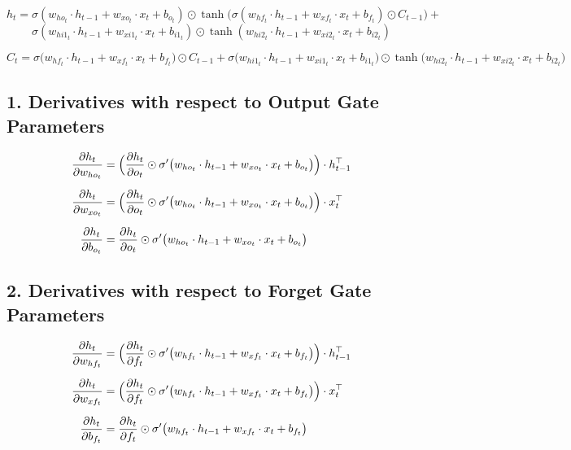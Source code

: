 \documentclass[12pt]{article}
\begin{document}
\[
h_t = \sigma(w_{ho_t} \cdot h_{t-1} + w_{xo_t} \cdot x_t + b_{o_t}) \odot \tanh\bigl( \sigma(w_{hf_t} \cdot h_{t-1} + w_{xf_t} \cdot x_t + b_{f_t}) \odot C_{t-1} \bigr) +
\]
\[
\sigma(w_{hi1_t} \cdot h_{t-1} + w_{xi1_t} \cdot x_t + b_{i1_t}) \odot \tanh(w_{hi2_t} \cdot h_{t-1} + w_{xi2_t} \cdot x_t + b_{i2_t})
\]


\begin{equation}
C_t = \sigma \bigl( w_{hf_t} \cdot h_{t-1} + w_{xf_t} \cdot x_t + b_{f_t} \bigr) \odot C_{t-1} + \sigma \bigl( w_{hi1_t} \cdot h_{t-1} + w_{xi1_t} \cdot x_t + b_{i1_t} \bigr) \odot \tanh \bigl( w_{hi2_t} \cdot h_{t-1} + w_{xi2_t} \cdot x_t + b_{i2_t} \bigr)
\end{equation}



\subsection*{1. Derivatives with respect to Output Gate Parameters}

\begin{align*}
\frac{\partial h_t}{\partial w_{ho_t}} &= \Bigl( \frac{\partial h_t}{\partial o_t} \odot \sigma'\bigl(w_{ho_t} \cdot h_{t-1} + w_{xo_t} \cdot x_t + b_{o_t}\bigr) \Bigr) \cdot h_{t-1}^\top \\[6pt]
\frac{\partial h_t}{\partial w_{xo_t}} &= \Bigl( \frac{\partial h_t}{\partial o_t} \odot \sigma'\bigl(w_{ho_t} \cdot h_{t-1} + w_{xo_t} \cdot x_t + b_{o_t}\bigr) \Bigr) \cdot x_t^\top \\[6pt]
\frac{\partial h_t}{\partial b_{o_t}}  &= \frac{\partial h_t}{\partial o_t} \odot \sigma'\bigl(w_{ho_t} \cdot h_{t-1} + w_{xo_t} \cdot x_t + b_{o_t}\bigr)
\end{align*}

\subsection*{2. Derivatives with respect to Forget Gate Parameters}

\begin{align*}
\frac{\partial h_t}{\partial w_{hf_t}} &= \Bigl( \frac{\partial h_t}{\partial f_t} \odot \sigma'\bigl(w_{hf_t} \cdot h_{t-1} + w_{xf_t} \cdot x_t + b_{f_t}\bigr) \Bigr) \cdot h_{t-1}^\top \\[6pt]
\frac{\partial h_t}{\partial w_{xf_t}} &= \Bigl( \frac{\partial h_t}{\partial f_t} \odot \sigma'\bigl(w_{hf_t} \cdot h_{t-1} + w_{xf_t} \cdot x_t + b_{f_t}\bigr) \Bigr) \cdot x_t^\top \\[6pt]
\frac{\partial h_t}{\partial b_{f_t}}  &= \frac{\partial h_t}{\partial f_t} \odot \sigma'\bigl(w_{hf_t} \cdot h_{t-1} + w_{xf_t} \cdot x_t + b_{f_t}\bigr)
\end{align*}
\end{document}
